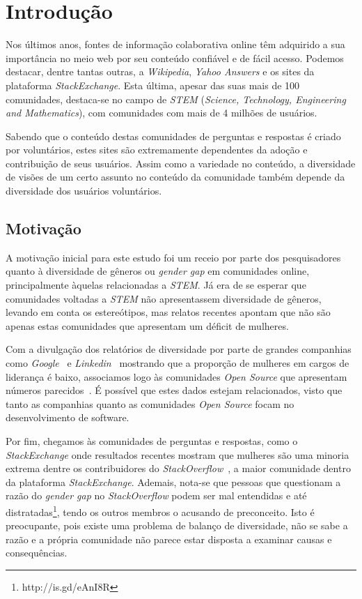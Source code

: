 \chapter{Introdução}
\label{ch:intro}

Nos últimos anos, fontes de informação colaborativa online têm adquirido a sua importância no meio web por seu conteúdo confiável e de fácil acesso. Podemos destacar, dentre tantas outras, a \emph{Wikipedia}, \emph{Yahoo Answers} e os sites da plataforma \emph{StackExchange}. Esta última, apesar das suas mais de 100 comunidades, destaca-se no campo de \emph{STEM} (\emph{Science, Technology, Engineering and Mathematics}), com comunidades com mais de 4 milhões de usuários. 

Sabendo que o conteúdo destas comunidades de perguntas e respostas é criado por voluntários, estes sites são extremamente dependentes da adoção e contribuição de seus usuários. Assim como a variedade no conteúdo, a diversidade de visões de um certo assunto no conteúdo da comunidade também depende da diversidade dos usuários voluntários.

\section{Motivação}

A motivação inicial para este estudo foi um receio por parte dos pesquisadores quanto à diversidade de gêneros ou \emph{gender gap} em comunidades online, principalmente àquelas relacionadas a \emph{STEM}. Já era de se esperar que comunidades voltadas a \emph{STEM} não apresentassem diversidade de gêneros, levando em conta os estereótipos, mas relatos recentes apontam que não são apenas estas comunidades que apresentam um déficit de mulheres. 

Com a divulgação dos relatórios de diversidade por parte de grandes companhias como \emph{Google}~\cite{google:report} e \emph{Linkedin}~\cite{linkedin:report} mostrando que a proporção de mulheres em cargos de liderança é baixo, associamos logo às comunidades \emph{Open Source} que apresentam números parecidos~\cite{rustad2011suck}. É possível que estes dados estejam relacionados, visto que tanto as companhias quanto as comunidades \emph{Open Source} focam no desenvolvimento de software.

Por fim, chegamos às comunidades de perguntas e respostas, como o \emph{StackExchange} onde resultados recentes mostram que mulheres são uma minoria extrema dentre os contribuidores do \emph{StackOverflow}~\cite{Vasilescu27092013}, a maior comunidade dentro da plataforma \emph{StackExchange}. Ademais, nota-se que pessoas que questionam a razão do \emph{gender gap} no \emph{StackOverflow} podem ser mal entendidas e até distratadas\footnote{http://is.gd/eAnI8R}, tendo os outros membros o acusando de preconceito. Isto é preocupante, pois existe uma problema de balanço de diversidade, não se sabe a razão e a própria comunidade não parece estar disposta a examinar causas e consequências.

